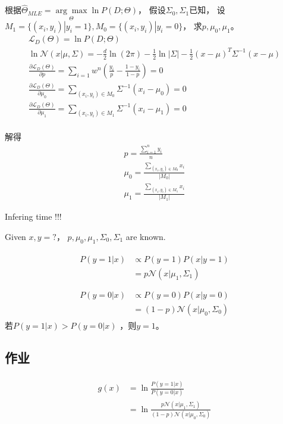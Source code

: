 \documentclass[UTF8]{ctexart}
\numberwithin{equation}{section}
\begin{document}
根据$\hat \Theta_{MLE}=\underset{\Theta}{\arg \max}\ln{P(D;\Theta)}$， 假设$\Sigma_0, \Sigma_1$已知，
设$M_1=\{(x_i, y_i)| y_i=1\}, M_0=\{(x_i, y_i)| y_i=0\}$，
求$p, \mu_0, \mu_1$。
\begin{gather*}
    \mathcal{L}_D(\Theta) = \ln{P(D;\Theta)} \\
    \ln{\mathcal{N}(x|\mu,\Sigma)} = -\frac{d}{2}\ln{(2\pi)}-\frac{1}{2}\ln{|\Sigma|}-\frac{1}{2}(x-\mu)^T\Sigma^{-1}(x-\mu) \\
    \frac{\partial \mathcal{L}_D(\Theta)}{\partial p} = \sum_{i=1}w^n(\frac{y_i}{p}-\frac{1-y_i}{1-p}) =0 \\
    \frac{\partial \mathcal{L}_D(\Theta)}{\partial \mu_0} =  \sum_{(x_i,y_i)\in M_0} {\Sigma^{-1}(x_i-\mu_0)} =0 \\
    \frac{\partial \mathcal{L}_D(\Theta)}{\partial \mu_1} =  \sum_{(x_i,y_i)\in M_1} {\Sigma^{-1}(x_i-\mu_1)} =0 \\
\end{gather*}

解得
\begin{gather*}
    p = \frac{\sum_{i=1}^n y_i}{n} \\
    \mu_0 = \frac{\sum_{(x_i, y_i)\in M_0}x_i}{|M_0|} \\
    \mu_1 = \frac{\sum_{(x_i, y_i)\in M_1}x_i}{|M_1|} 
\end{gather*}

Infering time !!!

Given $x, y=?$， $p, \mu_0, \mu_1, \Sigma_0, \Sigma_1$ are known.

\begin{gather*}
    \begin{aligned}
        P(y=1|x) & \propto P(y=1)P(x|y=1) \\    
        &=p \mathcal{N}(x|\mu_1, \Sigma_1) \\
    \end{aligned}
    \\
    \begin{aligned}
        P(y=0|x) & \propto P(y=0)P(x|y=0) \\    
        &=(1-p) \mathcal{N}(x|\mu_0, \Sigma_0) 
    \end{aligned}
\end{gather*}
若$ P(y=1|x) >  P(y=0|x)$ ，则$y=1$。

\subsection{\textbf{作业} }
\begin{gather*}
    \begin{aligned}
        g(x) &=\ln{\frac{P(y=1|x)}{P(y=0|x)}} \\     
        &=\ln{\frac{p \mathcal{N}(x|\mu_1, \Sigma_1)}{(1-p) \mathcal{N}(x|\mu_0, \Sigma_0) }}
    \end{aligned}
\end{gather*}
\end{document}
